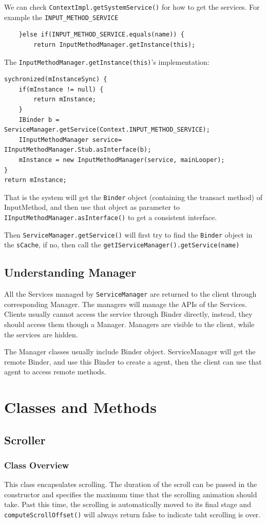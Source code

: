 \documentclass[11pt, a4paper]{book}
\begin{document}
We can check \verb|ContextImpl.getSystemService()| for how to get the services.
For example the \verb|INPUT_METHOD_SERVICE|
\begin{verbatim}
    }else if(INPUT_METHOD_SERVICE.equals(name)) {
        return InputMethodManager.getInstance(this);
\end{verbatim}
The \verb|InputMethodManager.getInstance(this)|'s implementation:
\begin{verbatim}
sychronized(mInstanceSync) {
    if(mInstance != null) {
        return mInstance;
    }
    IBinder b = ServiceManager.getService(Context.INPUT_METHOD_SERVICE);
    IInputMethodManager service= IInputMethodManager.Stub.asInterface(b);
    mInstance = new InputMethodManager(service, mainLooper);
}
return mInstance;
\end{verbatim}
That is the system will get the \verb|Binder| object (containing the transact
method) of InputMethod, and then use that object as parameter to
\verb|IInputMethodManager.asInterface()| to get a consistent interface.

Then \verb|ServiceManager.getService()| will first try to find the \verb|Binder|
object in the \verb|sCache|, if no, then call the
\verb|getIServiceManager().getService(name)|
\section{Understanding Manager}
All the Services managed by \verb|ServiceManager| are returned to the client
through corresponding Manager. The managers will manage the APIs of the
Services. Clients usually cannot access the service through Binder directly,
instead, they should access them though a Manager. Managers are visible to the
client, while the services are hidden.

The Manager classes usually include Binder object. ServiceManager will get the
remote Binder, and use this Binder to create a agent, then the client can use
that agent to access remote methods.



\chapter{Classes and Methods}
\section{Scroller}
\subsection{Class Overview}
This class encapsulates scrolling. The duration of the scroll can be passed
 in the constructor and specifies the maximum time that the scrolling animation
should take. Past this time, the scrolling is automatically moved to its final
stage and \verb|computeScrollOffset()| will always return false to indicate taht
scrolling is over.
\end{document}
